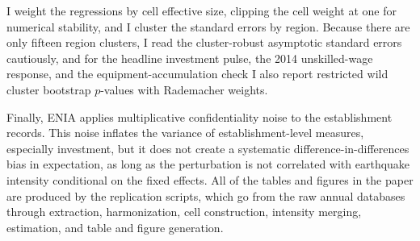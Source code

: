 \documentclass[12pt]{article}
\begin{document}
I weight the regressions by cell effective size, clipping the cell weight at one for numerical stability, and
I cluster the standard errors by region. Because there are only fifteen region clusters, I read the
cluster-robust asymptotic standard errors cautiously, and for the headline investment pulse, the 2014
unskilled-wage response, and the equipment-accumulation check I also report restricted wild cluster bootstrap
$p$-values with Rademacher weights.

Finally, ENIA applies multiplicative confidentiality noise to the establishment records. This noise inflates
the variance of establishment-level measures, especially investment, but it does not create a systematic
difference-in-differences bias in expectation, as long as the perturbation is not correlated with earthquake
intensity conditional on the fixed effects. All of the tables and figures in the paper are produced by the
replication scripts, which go from the raw annual databases through extraction, harmonization, cell
construction, intensity merging, estimation, and table and figure generation.
\end{document}
